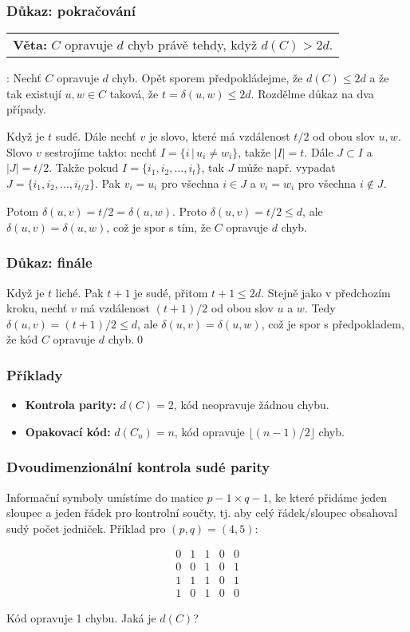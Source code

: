 \documentclass{beamer}
\newenvironment{veta}
{
    \begin{center}
    \begin{tabular}{p{9cm}}
    \textbf{Věta:}
}
{
    \end{tabular}
    \end{center}
}
\newcommand{\sep}{\,|\,}
\newenvironment{itemizex}%
  {\large \begin{itemize}%
    \setlength{\itemsep}{8pt}%
    \setlength{\parskip}{8pt}}%
  {\end{itemize}}
\begin{document}
\begin{frame}[t,fragile]\frametitle{Důkaz: pokračování} 
\begin{veta}$C$ opravuje $d$ chyb právě tehdy, když $d(C)>2d$.\end{veta}
\uv{$\Rightarrow$}: Nechť $C$ opravuje $d$ chyb. Opět sporem předpokládejme, že $d(C)\le 2d$ a že tak existují $u,w\in C$ taková, že $t=\delta(u,w)\le2d$. Rozdělme důkaz na dva případy.

Když je $t$ sudé. Dále nechť $v$ je slovo, které má vzdálenost $t/2$ od obou slov $u, w$. Slovo $v$ sestrojíme takto: nechť $I=\{i\sep u_i\ne w_i\}$, takže $|I|=t$. Dále $J\subset I$ a $|J|=t/2$. Takže pokud $I=\{i_1, i_2, \dots, i_t\}$, tak $J$ může např. vypadat $J=\{i_1, i_2, \dots, i_{t/2}\}$. Pak $v_i=u_i$ pro všechna $i\in J$ a $v_i=w_i$ pro všechna $i\notin J$.

Potom $\delta(u,v)=t/2=\delta(u,w)$. Proto $\delta(u,v)=t/2\le d$, ale $\delta(u,v)=\delta(u,w)$, což je spor s tím, že $C$ opravuje $d$ chyb. 
\end{frame}


\begin{frame}[t,fragile]\frametitle{Důkaz: finále} 
Když je $t$ liché. Pak $t+1$ je sudé, přitom $t+1\le2d$. Stejně jako v předchozím kroku, nechť $v$ má vzdálenost $(t+1)/2$ od obou slov $u$ a $w$. Tedy $\delta(u,v)=(t+1)/2\le d$, ale $\delta(u,v)=\delta(u,w)$, což je spor s předpokladem, že kód $C$ opravuje $d$ chyb.\qed
\end{frame}


\begin{frame}[t,fragile]\frametitle{Příklady} 
    \begin{itemizex}
        \item \textbf{Kontrola parity:} $d(C)=2$, kód neopravuje žádnou chybu.
        \item \textbf{Opakovací kód:} $d(C_n)=n$, kód opravuje $\lfloor(n-1)/2\rfloor$ chyb. 
    \end{itemizex}


\end{frame}



\begin{frame}[t,fragile]\frametitle{Dvoudimenzionální kontrola sudé parity} 
Informační symboly umístíme do matice $p-1\times q-1$, ke které přidáme jeden sloupec a jeden řádek pro kontrolní součty, tj. aby celý řádek/sloupec obsahoval sudý počet jedniček. Příklad pro $(p,q)=(4,5)$:

$$
\begin{array}{cccc|c}
0&1&1&0&0\\
0&0&1&0&1\\
1&1&1&0&1\\\hline
1&0&1&0&0
\end{array}
$$

Kód opravuje 1 chybu. Jaká je $d(C)$?
\end{frame}
\end{document}
